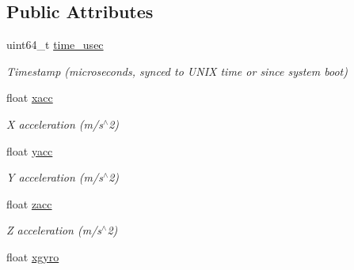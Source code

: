 \subsection*{Public Attributes}
\begin{DoxyCompactItemize}
\item 
\hypertarget{struct____mavlink__hil__sensor__t_a45de41520af13fd33f21c82c72a98b75}{uint64\+\_\+t \hyperlink{struct____mavlink__hil__sensor__t_a45de41520af13fd33f21c82c72a98b75}{time\+\_\+usec}}\label{struct____mavlink__hil__sensor__t_a45de41520af13fd33f21c82c72a98b75}

\begin{DoxyCompactList}\small\item\em Timestamp (microseconds, synced to U\+N\+I\+X time or since system boot) \end{DoxyCompactList}\item 
\hypertarget{struct____mavlink__hil__sensor__t_a20c3e6c7f8dd61b698cb617ec76c4b9d}{float \hyperlink{struct____mavlink__hil__sensor__t_a20c3e6c7f8dd61b698cb617ec76c4b9d}{xacc}}\label{struct____mavlink__hil__sensor__t_a20c3e6c7f8dd61b698cb617ec76c4b9d}

\begin{DoxyCompactList}\small\item\em X acceleration (m/s$^\wedge$2) \end{DoxyCompactList}\item 
\hypertarget{struct____mavlink__hil__sensor__t_a3649b04bdbc3d90b3c8da37b6ab02d6c}{float \hyperlink{struct____mavlink__hil__sensor__t_a3649b04bdbc3d90b3c8da37b6ab02d6c}{yacc}}\label{struct____mavlink__hil__sensor__t_a3649b04bdbc3d90b3c8da37b6ab02d6c}

\begin{DoxyCompactList}\small\item\em Y acceleration (m/s$^\wedge$2) \end{DoxyCompactList}\item 
\hypertarget{struct____mavlink__hil__sensor__t_acbecb9b5205c1b4fa0c43c2c45f78b4d}{float \hyperlink{struct____mavlink__hil__sensor__t_acbecb9b5205c1b4fa0c43c2c45f78b4d}{zacc}}\label{struct____mavlink__hil__sensor__t_acbecb9b5205c1b4fa0c43c2c45f78b4d}

\begin{DoxyCompactList}\small\item\em Z acceleration (m/s$^\wedge$2) \end{DoxyCompactList}\item 
\hypertarget{struct____mavlink__hil__sensor__t_a3b4035c288cba98923051942dfd85dc0}{float \hyperlink{struct____mavlink__hil__sensor__t_a3b4035c288cba98923051942dfd85dc0}{xgyro}}\label{struct____mavlink__hil__sensor__t_a3b4035c288cba98923051942dfd85dc0}


\end{DoxyCompactItemize}
